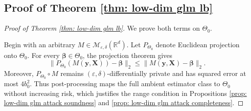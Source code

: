 \documentclass[letterpaper,12pt]{article}
\numberwithin{equation}{section}
\theoremstyle{plain}
\numberwithin{Theorem}{section}
\numberwithin{proposition}{section}
\numberwithin{Lemma}{section}
{
	\theoremstyle{definition}
	\newtheorem{Definition}{Definition}
	\newtheorem{example}{Example}
	\numberwithin{example}{section}
	\newtheorem{fact}{Fact}
	\numberwithin{fact}{section}
	\newtheorem{remark}{Remark}
}
\newcommand{\rev}[1]{#1}
\newcommand{\furtherrev}[1]{#1}
\newcommand{\1}{\mathbbm{1}}
\def\bbeta{{\boldsymbol{\beta}}}
\begin{document}
\subsection{Proof of Theorem \ref{thm: low-dim glm lb}}\label{sec: proof of thm: low-dim glm lb}
\begin{proof}[Proof of Theorem \ref{thm: low-dim glm lb}]
	\rev{We prove both terms on $\Theta_0$.}
	
	{\furtherrev{Begin with an arbitrary $M\in\mathcal M_{\varepsilon,\delta}(\mathbb R^d)$.} Let $P_{\Theta_0}$ denote Euclidean projection onto $\Theta_0$. For every $\bbeta\in\Theta_0$, the projection theorem gives
	\[
	\|P_{\Theta_0}(M(\bm y,\bm X))-\bbeta\|_2\leq \|M(\bm y,\bm X)-\bbeta\|_2.
	\]
	Moreover, $P_{\Theta_0}\circ M$ remains $(\varepsilon,\delta)$-differentially private and has squared error at most $4b_0^2$. \furtherrev{Thus post-processing maps the full ambient estimator class to $\Theta_0$ without increasing risk, which justifies the range condition in Propositions \ref{prop: low-dim glm attack soundness} and \ref{prop: low-dim glm attack completeness}.}

}
\end{proof}
\end{document}
